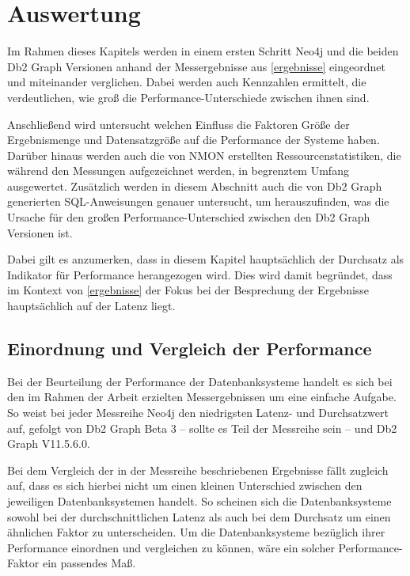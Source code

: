 \chapter{Auswertung}
\label{auswertung}
Im Rahmen dieses Kapitels werden in einem ersten Schritt Neo4j und die beiden Db2 Graph Versionen anhand der Messergebnisse aus \autoref{ergebnisse} eingeordnet und miteinander verglichen. Dabei werden auch Kennzahlen ermittelt, die verdeutlichen, wie groß die Performance-Unterschiede zwischen ihnen sind. 

Anschließend wird untersucht welchen Einfluss die Faktoren Größe der Ergebnismenge und Datensatzgröße auf die Performance der Systeme haben. Darüber hinaus werden auch die von NMON erstellten Ressourcenstatistiken, die während den Messungen aufgezeichnet werden, in begrenztem Umfang ausgewertet. Zusätzlich werden in diesem Abschnitt auch die von Db2 Graph generierten SQL-Anweisungen genauer untersucht, um herauszufinden, was die Ursache für den großen Performance-Unterschied zwischen den Db2 Graph Versionen ist.

Dabei gilt es anzumerken, dass in diesem Kapitel hauptsächlich der Durchsatz als Indikator für Performance herangezogen wird. Dies wird damit begründet, dass im Kontext von \autoref{ergebnisse} der Fokus bei der Besprechung der Ergebnisse hauptsächlich auf der Latenz liegt.

\section{Einordnung und Vergleich der Performance}
\label{auswertung:einordnung}
Bei der Beurteilung der Performance der Datenbanksysteme handelt es sich bei den im Rahmen der Arbeit erzielten Messergebnissen um eine einfache Aufgabe. So weist bei jeder Messreihe Neo4j den niedrigsten Latenz- und Durchsatzwert auf, gefolgt von Db2 Graph Beta 3 -- sollte es Teil der Messreihe sein -- und Db2 Graph V11.5.6.0. 

Bei dem Vergleich der in der Messreihe beschriebenen Ergebnisse fällt zugleich auf, dass es sich hierbei nicht um einen kleinen Unterschied zwischen den jeweiligen Datenbanksystemen handelt. So scheinen sich die Datenbanksysteme sowohl bei der durchschnittlichen Latenz als auch bei dem Durchsatz um einen ähnlichen Faktor zu unterscheiden. Um die Datenbanksysteme bezüglich ihrer Performance einordnen und vergleichen zu können, wäre ein solcher Performance-Faktor ein passendes Maß. 

